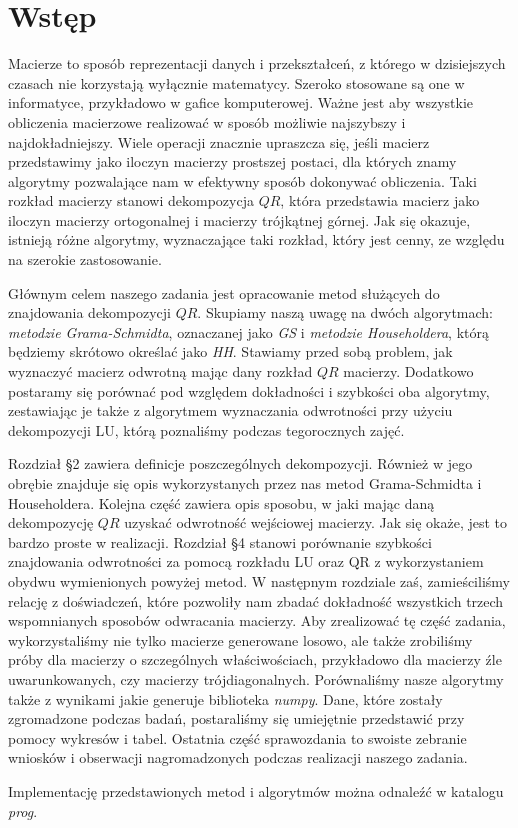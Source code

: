 \section{Wstęp}
Macierze to sposób reprezentacji danych i przekształceń, z którego w dzisiejszych
czasach nie korzystają wyłącznie matematycy. Szeroko stosowane są one
w informatyce, przykładowo w gafice komputerowej. Ważne jest aby wszystkie
obliczenia macierzowe realizować w sposób możliwie najszybszy i najdokładniejszy.
Wiele operacji znacznie upraszcza się, jeśli macierz przedstawimy jako
iloczyn macierzy prostszej postaci, dla których znamy algorytmy pozwalające
nam w efektywny sposób dokonywać obliczenia. Taki rozkład macierzy stanowi
dekompozycja $QR$, która przedstawia macierz jako iloczyn macierzy ortogonalnej
i macierzy trójkątnej górnej. Jak się okazuje, istnieją różne algorytmy,
wyznaczające taki rozkład, który jest cenny, ze względu na szerokie zastosowanie.

Głównym celem naszego zadania jest opracowanie metod służących do
znajdowania dekompozycji $QR$. Skupiamy naszą uwagę na dwóch algorytmach: \textit{metodzie Grama-Schmidta},
oznaczanej jako \textit{GS}
i \textit{metodzie Householdera},
którą będziemy skrótowo określać jako \textit{HH}. Stawiamy przed sobą problem, jak wyznaczyć
macierz odwrotną mając dany rozkład $QR$ macierzy. Dodatkowo postaramy się
porównać pod względem dokładności i szybkości oba algorytmy,
zestawiając je także z algorytmem wyznaczania odwrotności przy użyciu
dekompozycji LU, którą poznaliśmy podczas tegorocznych zajęć.

Rozdział \S2 zawiera definicje poszczególnych dekompozycji. Również w jego
obrębie znajduje się opis wykorzystanych przez nas metod Grama-Schmidta i Householdera.
Kolejna część zawiera opis sposobu, w jaki mając daną dekompozycję $QR$
uzyskać odwrotność wejściowej macierzy. Jak się okaże, jest to bardzo proste
w realizacji. Rozdział \S4 stanowi porównanie szybkości znajdowania
odwrotności za pomocą rozkładu LU oraz QR z wykorzystaniem obydwu
wymienionych powyżej metod. W następnym rozdziale zaś, zamieściliśmy
relację z doświadczeń, które pozwoliły nam zbadać dokładność wszystkich
trzech wspomnianych sposobów odwracania macierzy. Aby zrealizować
tę część zadania, wykorzystaliśmy nie tylko macierze generowane losowo, ale
także zrobiliśmy próby dla macierzy o szczególnych właściwościach,
przykładowo dla macierzy źle uwarunkowanych, czy macierzy trójdiagonalnych.
Porównaliśmy nasze algorytmy także z wynikami jakie generuje biblioteka \textit{numpy}.
Dane, które zostały zgromadzone podczas badań, postaraliśmy się
umiejętnie przedstawić przy pomocy wykresów i tabel.
Ostatnia część sprawozdania to swoiste zebranie wniosków i obserwacji
nagromadzonych podczas realizacji naszego zadania.

Implementację przedstawionych metod i algorytmów można odnaleźć w katalogu \textit{prog}.




